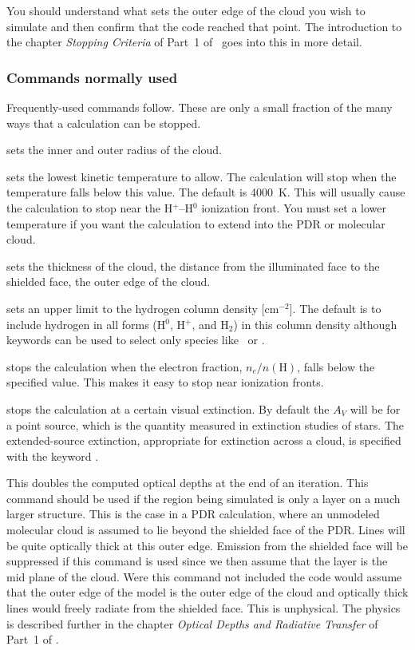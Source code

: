 \documentclass[12pt,twoside]{article}
\begin{document}
{You should understand what sets the outer edge of the cloud you wish
to simulate and then confirm that the code reached that point.  The
introduction to the chapter \emph{Stopping Criteria}
of Part~1 of \Hazy\ goes into
this in more detail.

\subsubsection{Commands normally used}

Frequently-used commands follow.
These are only a small fraction of the many ways that
a calculation can be stopped.

 sets the inner and outer radius of the cloud.

 sets the lowest
kinetic temperature to allow.  The
calculation will stop when the temperature falls below this value.  The
default is 4000~K.  This will usually cause the calculation to stop near
the H$^+$--H$^0$ ionization front.  You must
set a lower temperature if you want
the calculation to extend into the PDR or molecular cloud.

 sets the thickness
of the cloud, the distance from the
illuminated face to the shielded face, the outer edge of the cloud.

  sets an upper
limit to the hydrogen column density
[cm$^{-2}$].
The default is to include hydrogen in all forms (H$^0$,
H$^+$, and H$_2$) in this column density
although keywords can be used to select only species
like \hplus\ or \hO.

 stops the calculation
when the electron fraction, $n_e/n(\mathrm{H})$,
falls below the specified value.  This makes it easy to stop near ionization
fronts.

 stops the calculation at a
certain visual extinction.
By default the $A_V$ will be for a point source,
which is the quantity measured in extinction studies of stars.
The extended-source extinction, appropriate for extinction
across a cloud, is specified with the keyword .

\label{command:double}
This doubles the computed optical depths at the end of an
iteration.  This command should be used if the region being simulated is
only a layer on a much larger structure.  This is the case in a PDR
calculation, where an unmodeled molecular cloud is assumed to lie beyond
the shielded face of the PDR.  Lines will be quite optically thick at this
outer edge.  Emission from the shielded face will be suppressed if this
command is used since we then assume that the layer is the mid plane of
the cloud. Were this command not included the code would assume that the
outer edge of the model is the outer edge of the cloud and optically thick
lines would freely radiate from the shielded face.  This is unphysical.
The physics is described further in the chapter
\emph{Optical Depths and Radiative Transfer} of Part~1 of \Hazy.

}
\end{document}
